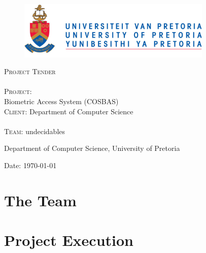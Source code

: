 \documentclass[12pt]{article}
\begin{document}
\begin{titlepage}
	\begin{center}
		
		\begin{figure}[t]
			\centering
			\includegraphics[width=350px]{UP_Logo.png}
		\end{figure}
		
		\textsc{\Huge Project Tender} \\ 

		\textsc{\huge \\Project:\\	}
		\huge Biometric Access System (COSBAS) 
		\textsc{\Large \\Client:}
		\large Department of Computer Science \\

		\textsc{\huge \\ Team:}
		\huge \textsc{}undecidables\textsc{}
		
		\small Department of Computer Science, University of Pretoria \\

	\vfill

	{\large Date: \today}		
		
		
	\end{center}
\end{titlepage}

\pagebreak
\tableofcontents

\pagebreak

\section{The Team}


\pagebreak
\section{Project Execution}

\end{document}

